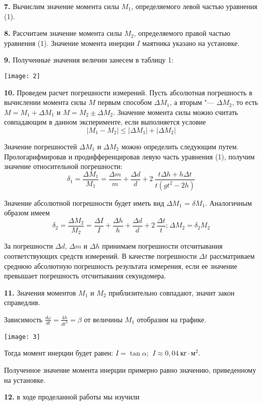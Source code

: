 \documentclass{article}
\begin{document}
\textbf{7.} Вычислим значение момента силы $M_1$, определяемого левой
частью уравнения (1).

\textbf{8.} Рассчитаем значение момента силы $M_2$, определяемого
правой частью уравнения (1). Значение момента инерции $I$
маятника указано на установке.

\textbf{9.} Полученные значения величин занесем в таблицу 1:

\texttt{[image: 2]}

\textbf{10.} Проведем расчет погрешности измерений. Пусть абсолютная
погрешность в вычислении момента силы $M$ первым способом
$\Delta M_1$, а вторым "--- $\Delta M_2$, то есть $M=M_1+
\Delta M_1$ и $M=M_2\pm\Delta M_2$. Значение момента силы
можно считать совпадающим в данном эксперименте, если
выполняется условие 
\begin{equation}
    \left\lvert M_1 - M_2 \right\rvert \leq
    \left\lvert \Delta M_1 \right\rvert + 
    \left\lvert \Delta M_2 \right\rvert
\end{equation}

Значение погрешностей $\Delta M_1$ и $\Delta M_2$ можно
определить следующим путем. Прологарифмировав и
продифференцировав левую часть уравнения (1), получим значение
относительной погрешности:
\begin{equation}
    \delta_1 = \frac{\Delta M_1}{M_1} = \frac{\Delta m}{m}
    + \frac{\Delta d}{d} + 2~\frac{t\Delta h +
    h\Delta t}{t(gt^2-2h)}
\end{equation}

Значение абсолютной погрешности будет иметь вид $\Delta M_1$
= $\delta M_1$. Аналогичным образом имеем
\begin{equation}
    \delta_2 = \frac{\Delta M_2}{M_2} = \frac{\Delta I}{I}
    + \frac{\Delta h}{h} + \frac{\Delta d}{d} +
    2~\frac{\Delta t}{t} \text{;}~ \Delta M_2 = \delta_2 M_2
\end{equation}

За погрешности $\Delta d$, $\Delta m$ и $\Delta h$ принимаем
погрешности отсчитывания соответствующих средств измерений.
В качестве погрешности $\Delta t$ рассматриваем среднюю 
абсолютную погрешность результата измерения, если ее 
значение превышает погрешность отсчитывания секундомера.

\textbf{11.} Значения моментов $M_1$ и $M_2$ приблизительно
совпадают, значит закон справедлив.

Зависимость $\frac{d\omega}{dt}=\frac{4h}{dt^2}=\beta$ от 
величины $M_1$ отобразим на графике.

\vspace{0.6cm}

\texttt{[image: 3]}

\vspace{0.6cm}

Тогда момент инерции будет равен: $I=\tan{\alpha}$;
$~ I\approx 0,04~\text{кг}\cdot \text{м}^2$.

Полученное значение момента инерции примерно равно значению,
приведенному на установке.

\textbf{12.} 
в ходе проделанной работы мы изучили 
\end{document}
